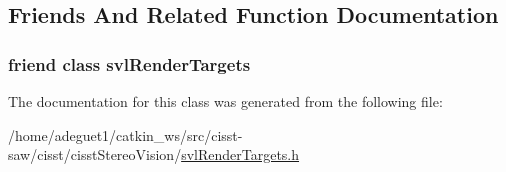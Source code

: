 \subsection{Friends And Related Function Documentation}
\hypertarget{classsvl_render_target_base_ad804de78e5a33b34b46d99e75bab0aed}{
\subsubsection[{svl\-Render\-Targets}]{\setlength{\rightskip}{0pt plus 5cm}friend class {\bf svl\-Render\-Targets}\hspace{0.3cm}{\ttfamily [friend]}}}\label{classsvl_render_target_base_ad804de78e5a33b34b46d99e75bab0aed}


The documentation for this class was generated from the following file\-:\begin{DoxyCompactItemize}
\item 
/home/adeguet1/catkin\-\_\-ws/src/cisst-\/saw/cisst/cisst\-Stereo\-Vision/\hyperlink{svl_render_targets_8h}{svl\-Render\-Targets.\-h}\end{DoxyCompactItemize}
